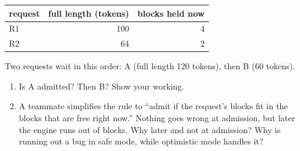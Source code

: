 \documentclass[10pt]{article}
\newcommand{\answerbox}[1]{%
  \begin{tcolorbox}[colback=white, colframe=black!40, boxrule=0.4pt,
                    arc=0pt, height=#1]\end{tcolorbox}}
\begin{document}
\begin{center}
\begin{tabular}{lrr}
\toprule
request & full length (tokens) & blocks held now \\
\midrule
R1 & 100 & 4 \\
R2 & 64 & 2 \\
\bottomrule
\end{tabular}
\end{center}

Two requests wait in this order: A (full length 120 tokens), then B (60
tokens).
\begin{enumerate}[label=(\roman*), nosep]
\item Is A admitted? Then B? Show your working.
\item A teammate simplifies the rule to ``admit if the request's blocks
  fit in the blocks that are free right now.'' Nothing goes wrong at
  admission, but later the engine runs out of blocks. Why later and not
  at admission? Why is running out a bug in safe mode, while optimistic
  mode handles it?
\end{enumerate}
\answerbox{5cm}
\end{document}
